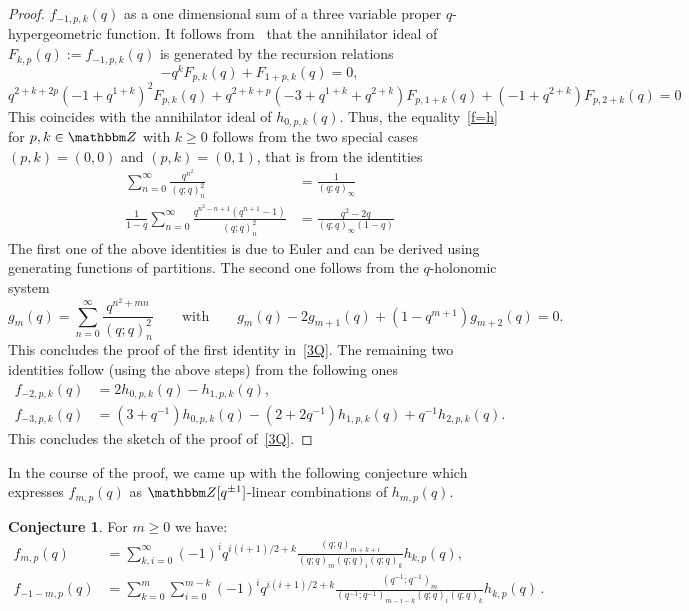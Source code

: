 \documentclass[12pt,reqno]{amsart}
\theoremstyle{definition}
\newtheorem{conjecture}[theorem]{Conjecture}
\def\BZ{\mathbbm Z}
\def\be{\begin{equation}}
\def\ee{\end{equation}}
\begin{document}
\begin{proof}
$f_{-1,p,k}(q)$ as a one dimensional sum of a three variable proper $q$-hypergeometric
function. It follows from~\cite{Koutschan:holofunctions} that the annihilator ideal
of $F_{k,p}(q):=f_{-1,p,k}(q)$ is generated by the recursion relations
{\small
  \be
-q^k F_{p, k}(q) + F_{1 + p, k}(q)=0,
\ee
\be
q^{2 + k + 2 p} (-1 + q^{1 + k})^2 F_{p, k}(q) + 
q^{2 + k + p} (-3 + q^{1 + k} + q^{2 + k}) F_{p, 1 + k}(q)
+ (-1 + q^{2 + k}) F_{p, 2 + k}(q)=0
\ee
}
This coincides with the annihilator ideal of $h_{0,p,k}(q)$. Thus, the
equality~\eqref{f=h} for $p,k \in \BZ$ with $k \geq 0$ follows from the
two special cases $(p,k)=(0,0)$ and $(p,k)=(0,1)$, that is from the identities
\be
\label{euler}
\begin{aligned}
  \sum_{n=0}^{\infty}\frac{q^{n^{2}}}{(q;q)_{n}^{2}}
  & =
  \frac{1}{(q;q)_{\infty}}
  \\
  \frac{1}{1-q}\sum_{n=0}^{\infty}\frac{q^{n^{2}-n+1}(q^{n+1}-1)}{(q;q)_{n}^{2}}
  & =
  \frac{q^{2}-2q}{(q;q)_{\infty}(1-q)}
\end{aligned}  
\ee
The first one of the above identities is due to Euler and can be derived using
generating functions of partitions. The second one follows from the $q$-holonomic
system
\be
  g_{m}(q)=\sum_{n=0}^{\infty}\frac{q^{n^{2}+mn}}{(q;q)_{n}^{2}}
  \qquad\text{with}\qquad
  g_{m}(q)-2g_{m+1}(q)+(1-q^{m+1})g_{m+2}(q)=0.
\ee
This concludes the proof of the first identity
in~\eqref{3Q}. The remaining two identities follow (using the above steps)
from the following ones
\be
\label{Q23}
\begin{aligned}
  f_{-2,p,k}(q)
  &=
  2h_{0,p,k}(q)-h_{1,p,k}(q),\\
  f_{-3,p,k}(q)
  &=
  (3+q^{-1})h_{0,p,k}(q)-(2+2q^{-1})h_{1,p,k}(q)+q^{-1}h_{2,p,k}(q).
\end{aligned}
\ee
This concludes the sketch of the proof of~\eqref{3Q}. 
\end{proof}
In the course of the proof, we came up with the following conjecture which
expresses $f_{m,p}(q)$ as $\BZ[q^{\pm 1}]$-linear combinations of $h_{m,p}(q)$.

\begin{conjecture}
  For $m \geq 0$ we have:
  \be
\begin{aligned}
  f_{m,p}(q)
  &=
  \sum_{k,i=0}^{\infty}(-1)^iq^{i(i+1)/2+k}
  \frac{(q;q)_{m+k+i}}{(q;q)_{m}(q;q)_{i}(q;q)_{k}}h_{k,p}(q),\\
  f_{-1-m,p}(q)
  &=
  \sum_{k=0}^{m}\sum_{i=0}^{m-k}(-1)^iq^{i(i+1)/2+k}
  \frac{(q^{-1};q^{-1})_{m}}{(q^{-1};q^{-1})_{m-i-k}(q;q)_{i}(q;q)_{k}}h_{k,p}(q)
  \,.
\end{aligned}
\ee
\end{conjecture}



%

\end{document}
